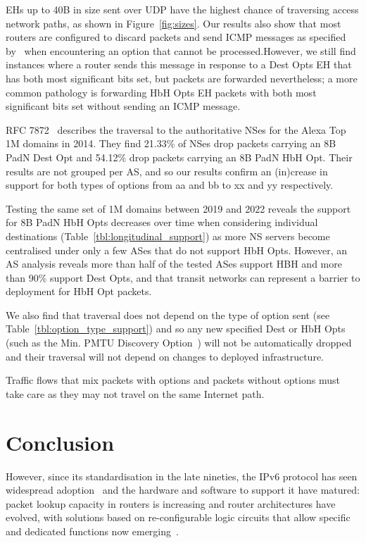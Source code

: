 \documentclass[conference]{IEEEtran}
\begin{document}
EHs up to 40B in size sent over UDP have the highest chance of traversing access network paths, as shown in Figure~\ref{fig:sizes}.
Our results also show that most routers are configured to discard packets and send ICMP messages as specified by~\cite{RFC4443} when encountering an option that cannot be processed.However, we still find instances where a router sends this message in response to a Dest Opts EH that has both most significant bits set, but packets are forwarded nevertheless; a more common pathology is forwarding HbH Opts EH packets with both most significant bits set without sending an ICMP message.
 
RFC 7872~\cite{RFC7872} describes the traversal to the authoritative NSes for the Alexa Top 1M domains in 2014. They find 21.33\% of NSes drop packets carrying an 8B PadN Dest Opt and 54.12\% drop packets carrying an 8B PadN HbH Opt.
Their results are not grouped per AS, and so our results confirm an (in)crease in support for both types of options from aa and bb to xx and yy respectively.

Testing the same set of 1M domains between 2019 and 2022 reveals the support for 8B PadN HbH Opts decreases over time when considering individual destinations (Table~\ref{tbl:longitudinal_support}) as more NS servers become centralised under only a few ASes that do not support HbH Opts. However, an AS analysis reveals more than half of the tested ASes support HBH and more than 90\% support Dest Opts, and that transit networks can represent a barrier to deployment for HbH Opt packets.

We also find that traversal does not depend on the type of option sent (see Table~\ref{tbl:option_type_support}) and so any new specified Dest or HbH Opts (such as the Min. PMTU Discovery Option~\cite{rfc9268}) will not be automatically dropped and their traversal will not depend on changes to deployed infrastructure.

Traffic flows that mix packets with options and packets without options must take care as they may not travel on the same Internet path.


\section{Conclusion}
\label{sec:conclusion}


However, since its standardisation in the late nineties, the IPv6 protocol has
seen widespread adoption~\cite{v6adoption_ton} and the hardware and software to
support it have matured: packet lookup capacity in routers is increasing and
router architectures have evolved, with solutions based on re-configurable
logic circuits that allow specific and dedicated functions now
emerging~\cite{cisco-silicon-one}.
\end{document}

